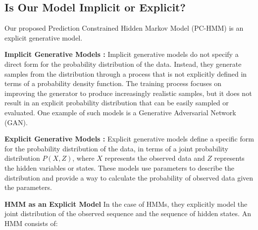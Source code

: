 \subsection{Is Our Model Implicit or Explicit?}
Our proposed Prediction Constrained Hidden Markov Model (PC-HMM) is an explicit generative model. 

\textbf{Implicit Generative Models \citep{xie2016theory, ngiam2011learning} :} Implicit generative models do not specify a direct form for the probability distribution of the data. Instead, they generate samples from the distribution through a process that is not explicitly defined in terms of a probability density function. The training process focuses on improving the generator to produce increasingly realistic samples, but it does not result in an explicit probability distribution that can be easily sampled or evaluated. One example of such models is a Generative Adversarial Network (GAN). 


\textbf{Explicit Generative Models \citep{goodfellow2014generative, arjovsky2017wasserstein}:} Explicit generative models define a specific form for the probability distribution of the data, in terms of a joint probability distribution \(P(X, Z)\), where \(X\) represents the observed data and \(Z\) represents the hidden variables or states. These models use parameters to describe the distribution and provide a way to calculate the probability of observed data given the parameters.

\textbf{HMM as an Explicit Model} In the case of HMMs, they explicitly model the joint distribution of the observed sequence and the sequence of hidden states. An HMM consists of:

